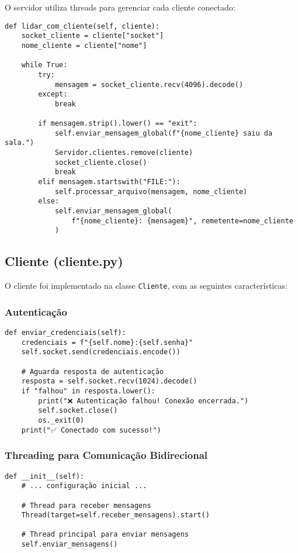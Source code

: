 \documentclass[12pt,a4paper]{article}
\begin{document}
O servidor utiliza threads para gerenciar cada cliente conectado:

\begin{lstlisting}[caption=Gerenciamento de clientes]
def lidar_com_cliente(self, cliente):
    socket_cliente = cliente["socket"]
    nome_cliente = cliente["nome"]
    
    while True:
        try:
            mensagem = socket_cliente.recv(4096).decode()
        except:
            break
            
        if mensagem.strip().lower() == "exit":
            self.enviar_mensagem_global(f"{nome_cliente} saiu da sala.")
            Servidor.clientes.remove(cliente)
            socket_cliente.close()
            break
        elif mensagem.startswith("FILE:"):
            self.processar_arquivo(mensagem, nome_cliente)
        else:
            self.enviar_mensagem_global(
                f"{nome_cliente}: {mensagem}", remetente=nome_cliente
            )
\end{lstlisting}

\subsection{Cliente (cliente.py)}

O cliente foi implementado na classe \texttt{Cliente}, com as seguintes características:

\subsubsection{Autenticação}

\begin{lstlisting}[caption=Sistema de autenticação]
def enviar_credenciais(self):
    credenciais = f"{self.nome}:{self.senha}"
    self.socket.send(credenciais.encode())
    
    # Aguarda resposta de autenticação
    resposta = self.socket.recv(1024).decode()
    if "falhou" in resposta.lower():
        print("❌ Autenticação falhou! Conexão encerrada.")
        self.socket.close()
        os._exit(0)
    print("✅ Conectado com sucesso!")
\end{lstlisting}

\subsubsection{Threading para Comunicação Bidirecional}

\begin{lstlisting}[caption=Implementação de threads no cliente]
def __init__(self):
    # ... configuração inicial ...
    
    # Thread para receber mensagens
    Thread(target=self.receber_mensagens).start()
    
    # Thread principal para enviar mensagens
    self.enviar_mensagens()
\end{lstlisting}
\end{document}

